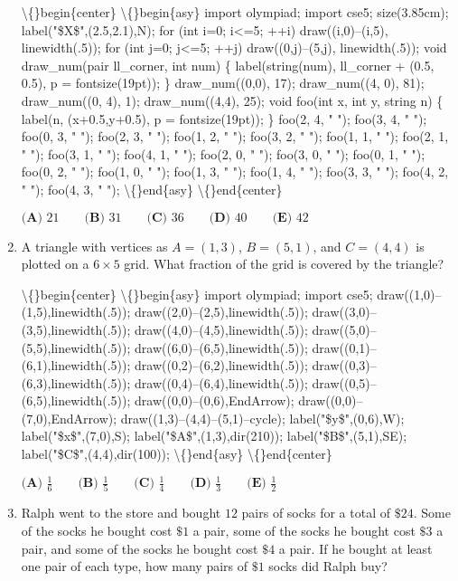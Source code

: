 \documentclass{article}
\begin{document}
\begin{enumerate}[label=\arabic*., itemsep=0.5em]
\textbackslash\{\}begin\{center\}
\textbackslash\{\}begin\{asy\}
import olympiad;
import cse5;
size(3.85cm); label("\$X\$",(2.5,2.1),N); for (int i=0; i<=5; ++i) draw((i,0)--(i,5), linewidth(.5));  for (int j=0; j<=5; ++j) draw((0,j)--(5,j), linewidth(.5)); void draw\_num(pair ll\_corner, int num)  \{ label(string(num), ll\_corner + (0.5, 0.5), p = fontsize(19pt)); \}  draw\_num((0,0), 17); draw\_num((4, 0), 81);  draw\_num((0, 4), 1);  draw\_num((4,4), 25);   void foo(int x, int y, string n) \{ label(n, (x+0.5,y+0.5), p = fontsize(19pt)); \}  foo(2, 4, " "); foo(3, 4, " "); foo(0, 3, " "); foo(2, 3, " "); foo(1, 2, " "); foo(3, 2, " "); foo(1, 1, " "); foo(2, 1, " "); foo(3, 1, " "); foo(4, 1, " "); foo(2, 0, " "); foo(3, 0, " "); foo(0, 1, " "); foo(0, 2, " "); foo(1, 0, " "); foo(1, 3, " "); foo(1, 4, " "); foo(3, 3, " "); foo(4, 2, " "); foo(4, 3, " ");
\textbackslash\{\}end\{asy\}
\textbackslash\{\}end\{center\}


\(\textbf{(A) }21\qquad\textbf{(B) }31\qquad\textbf{(C) }36\qquad\textbf{(D) }40\qquad \textbf{(E) }42\)\par \vspace{0.5em}\item A triangle with vertices as \(A=(1,3)\), \(B=(5,1)\), and \(C=(4,4)\) is plotted on a \(6\times5\) grid. What fraction of the grid is covered by the triangle?


\textbackslash\{\}begin\{center\}
\textbackslash\{\}begin\{asy\}
import olympiad;
import cse5;
draw((1,0)--(1,5),linewidth(.5));
draw((2,0)--(2,5),linewidth(.5));
draw((3,0)--(3,5),linewidth(.5));
draw((4,0)--(4,5),linewidth(.5));
draw((5,0)--(5,5),linewidth(.5));
draw((6,0)--(6,5),linewidth(.5));
draw((0,1)--(6,1),linewidth(.5));
draw((0,2)--(6,2),linewidth(.5));
draw((0,3)--(6,3),linewidth(.5));
draw((0,4)--(6,4),linewidth(.5));
draw((0,5)--(6,5),linewidth(.5)); 
draw((0,0)--(0,6),EndArrow);
draw((0,0)--(7,0),EndArrow);
draw((1,3)--(4,4)--(5,1)--cycle);
label("\$y\$",(0,6),W); label("\$x\$",(7,0),S);
label("\$A\$",(1,3),dir(210)); label("\$B\$",(5,1),SE); label("\$C\$",(4,4),dir(100));
\textbackslash\{\}end\{asy\}
\textbackslash\{\}end\{center\}


\(\textbf{(A) }\frac{1}{6} \qquad \textbf{(B) }\frac{1}{5} \qquad \textbf{(C) }\frac{1}{4} \qquad \textbf{(D) }\frac{1}{3} \qquad \textbf{(E) }\frac{1}{2}\)\par \vspace{0.5em}\item Ralph went to the store and bought \(12\) pairs of socks for a total of \(\$24\). Some of the socks he bought cost \(\$1\) a pair, some of the socks he bought cost \(\$3\) a pair, and some of the socks he bought cost \(\$4\) a pair. If he bought at least one pair of each type, how many pairs of \(\$1\) socks did Ralph buy?


\end{enumerate}
\end{document}
